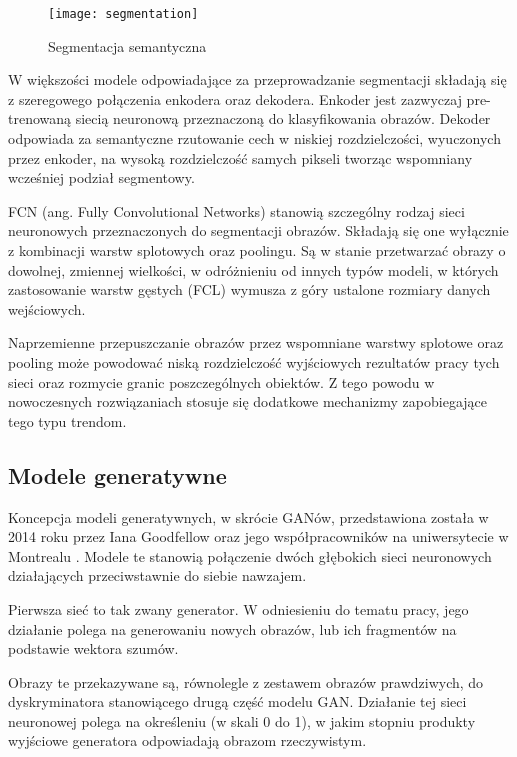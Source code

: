    \begin{figure}[h]
    \centering
    \texttt{[image: segmentation]}
    \caption[Segmentacja semantyczna - źródło: \url{https://devblogs.nvidia.com/image-segmentation-using-digits-5/}]{Segmentacja semantyczna}
    \label{fig:segmentation}
  \end{figure}

   W większości modele odpowiadające za przeprowadzanie segmentacji składają się z szeregowego połączenia enkodera oraz dekodera. Enkoder jest zazwyczaj pre-trenowaną siecią neuronową przeznaczoną do klasyfikowania obrazów. Dekoder odpowiada za semantyczne rzutowanie cech w niskiej rozdzielczości, wyuczonych przez enkoder, na wysoką rozdzielczość samych pikseli tworząc wspomniany wcześniej podział segmentowy.

   FCN (ang. Fully Convolutional Networks) stanowią szczególny rodzaj sieci neuronowych przeznaczonych do segmentacji obrazów. Składają się one wyłącznie z kombinacji warstw splotowych oraz poolingu. Są w stanie przetwarzać obrazy o dowolnej, zmiennej wielkości, w odróżnieniu od innych typów modeli, w których zastosowanie warstw gęstych (FCL) wymusza z góry ustalone rozmiary danych wejściowych.

   Naprzemienne przepuszczanie obrazów przez wspomniane warstwy splotowe oraz pooling może powodować niską rozdzielczość wyjściowych rezultatów pracy tych sieci oraz rozmycie granic poszczególnych obiektów. Z tego powodu w nowoczesnych rozwiązaniach stosuje się dodatkowe mechanizmy zapobiegające tego typu trendom.

  \subsection{Modele generatywne}
  \label{modele_generatywne}
   Koncepcja modeli generatywnych, w skrócie GANów, przedstawiona została w 2014 roku przez Iana Goodfellow oraz jego współpracowników na uniwersytecie w Montrealu \cite{gan}. Modele te stanowią połączenie dwóch głębokich sieci neuronowych działających przeciwstawnie do siebie nawzajem.

   Pierwsza sieć to tak zwany generator. W odniesieniu do tematu pracy, jego działanie polega na generowaniu nowych obrazów, lub ich fragmentów na podstawie wektora szumów.

   Obrazy te przekazywane są, równolegle z zestawem obrazów prawdziwych, do dyskryminatora stanowiącego drugą część modelu GAN. Działanie tej sieci neuronowej polega na określeniu (w skali 0 do 1), w jakim stopniu produkty wyjściowe generatora odpowiadają obrazom rzeczywistym.

